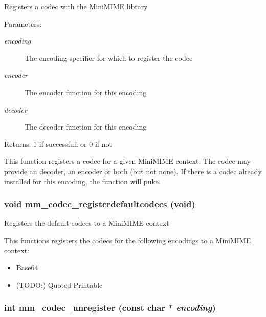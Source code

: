 Registers a codec with the Mini\-MIME library

\begin{Desc}
\item[Parameters:]
\begin{description}
\item[{\em encoding}]The encoding specifier for which to register the codec \item[{\em encoder}]The encoder function for this encoding \item[{\em decoder}]The decoder function for this encoding \end{description}
\end{Desc}
\begin{Desc}
\item[Returns:]1 if successfull or 0 if not\end{Desc}
This function registers a codec for a given Mini\-MIME context. The codec may provide an decoder, an encoder or both (but not none). If there is a codec already installed for this encoding, the function will puke. 
\subsubsection{\setlength{\rightskip}{0pt plus 5cm}void mm\_\-codec\_\-registerdefaultcodecs (void)}\label{group__codecs_gf39e72460fb85f5ca41f6e270a68aacc}


Registers the default codecs to a Mini\-MIME context

This functions registers the codecs for the following encodings to a Mini\-MIME context:

\begin{itemize}
\item Base64\item (TODO:) Quoted-Printable \end{itemize}
\subsubsection{\setlength{\rightskip}{0pt plus 5cm}int mm\_\-codec\_\-unregister (const char $\ast$ {\em encoding})}\label{group__codecs_g0c71696bc70f834386193e3c7a0e2ca4}


